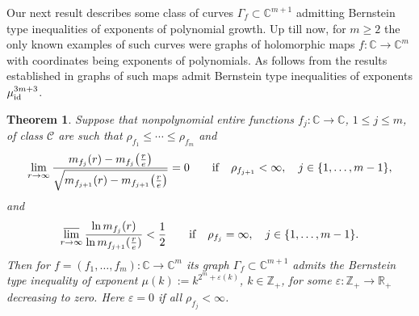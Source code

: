 \documentclass[11pt, oneside]{amsart}
\newtheorem{Th}{Theorem}[section]
\begin{document}
Our next result describes some class of curves $\Gamma_f\subset\mathbb C^{m+1}$ admitting  Bernstein type inequalities of exponents of polynomial growth.
Up till now, for $m\ge 2$ the only known examples of such curves were graphs of holomorphic maps $f:\mathbb C\rightarrow \mathbb C^m$ with coordinates being exponents of polynomials. As follows from the results established in  \cite{BBL}  graphs of such maps admit Bernstein type inequalities of exponents $\mu_{\rm id}^{3m+3}$. 
\begin{Th}\label{theo1.8}
Suppose that nonpolynomial entire functions $f_j:\mathbb C\rightarrow\mathbb C$, $1\le j\le m$, of class $\mathscr C$ are such that $\rho_{f_1}\le\cdots\le\rho_{f_m}$ and
\begin{equation}\label{eq1.4}
\lim_{r\rightarrow\infty}\frac{m_{f_j}(r)-m_{f_j}\bigl(\frac re\bigr)}{\sqrt{m_{f_{j+1}}(r)-m_{f_{j+1}}\bigl(\frac{r}{e}\bigr)}}=0\qquad {\rm if}\quad \rho_{f_{j+1}}<\infty,\quad
j\in\{1,\dots, m-1\},
\end{equation}
and
\begin{equation}\label{eq1.5}
\varlimsup_{r\rightarrow\infty}\frac{\ln m_{f_j}(r)}{\ln m_{f_{j+1}}(\frac re)}<\frac 12\qquad {\rm if}\quad \rho_{f_j}=\infty,\quad  j\in \{1,\dots, m-1\}.
\end{equation}
Then for $f=(f_1,\dots, f_{m}):\mathbb C\rightarrow\mathbb C^{m}$ its graph $\Gamma_f\subset\mathbb C^{m+1}$ admits the Bernstein type inequality of exponent $\mu(k):=k^{2^{m}+\varepsilon(k)}$, $k\in\mathbb Z_+$, for some $\varepsilon :
\mathbb Z_+\rightarrow \mathbb R_+$ decreasing to zero. Here $\varepsilon= 0$ if all $\rho_{f_j}<\infty$.
\end{Th}
\end{document}
